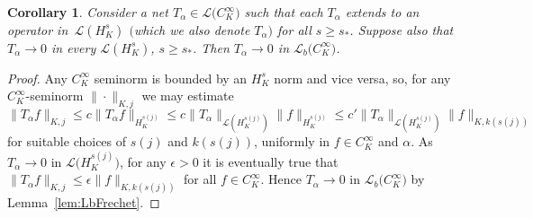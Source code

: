 \documentclass[11pt]{article}
\numberwithin{equation}{section}
\numberwithin{equation}{section}
\newtheorem{Corollary}[Theorem]{Corollary}
\newcommand{\LL}{{\mathcal L}}
\begin{document}
 \begin{Corollary} \label{cor:HstoCinfty}
 	Consider a net $T_\alpha\in \LL\big(C^\infty_K\big)$
 	such that each $T_\alpha$ extends to an operator in~$\LL(H^s_K)$ $($which we also denote $T_\alpha$$)$ for all $s\ge s_*$. Suppose also that $T_\alpha\to 0$ in every $\LL(H^s_K)$, $s\ge s_*$. Then $T_\alpha\to 0$ in $\LL_b\big(C^\infty_K\big)$.
 \end{Corollary}
 \begin{proof}
Any $C^\infty_K$ seminorm is bounded by an $H^s_K$ norm and vice versa, so, for any
 	$C^\infty_K$-seminorm $\|\cdot\|_{K,j}$ we may estimate
 	\begin{equation*}
 		\|T_\alpha f\|_{K,j} \le c \| T_\alpha f\|_{H^{s(j)}_K} \le c\|T_\alpha\|_{\LL(H^{s(j)}_K)} \|f\|_{H^{s(j)}_K}
 		\le c' \|T_\alpha\|_{\LL(H^{s(j)}_K)} \|f\|_{K,k(s(j))}
 	\end{equation*}
 	for suitable choices of $s(j)$ and $k(s(j))$, uniformly in $f\in C^\infty_K$ and $\alpha$.
 	As $T_\alpha\to 0$ in $\LL\big(H^{s(j)}_K\big)$, for any $\epsilon>0$ it is eventually true that
 	$\|T_\alpha f\|_{K,j} \le \epsilon \|f\|_{K,k(s(j))}$ for all $f\in C^\infty_K$. Hence $T_\alpha\to 0$ in $\LL_b\big(C^\infty_K\big)$ by Lemma~\ref{lem:LbFrechet}.
 \end{proof}
\end{document}
